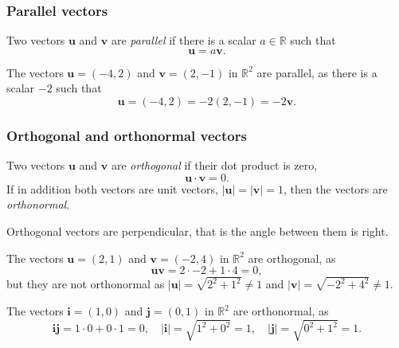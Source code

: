 \begin{frame}
\frametitle{Parallel vectors}
\begin{definition}
Two vectors $\mathbf{u}$ and $\mathbf{v}$ are \emph{parallel} if there is a scalar $a\in\mathbb{R}$ such that 
\[
\mathbf{u} = a\mathbf{v}.
\]
\end{definition}

The vectors $\mathbf{u}=(-4,2)$ and $\mathbf{v}=(2,-1)$ in $\mathbb{R}^2$ are parallel, as there is a scalar $-2$ such that
\[
\mathbf{u}= (-4,2) = -2(2,-1) = -2\mathbf{v}.
\]
\end{frame}


\begin{frame}
\frametitle{Orthogonal and orthonormal vectors}
\begin{definition}
Two vectors $\mathbf{u}$ and $\mathbf{v}$ are \emph{orthogonal} if their dot product is zero,
\[
\mathbf{u}\cdot \mathbf{v} = 0.
\]
If in addition both vectors are unit vectors, $|\mathbf{u}|=|\mathbf{v}|=1$, then the vectors are \emph{orthonormal}.
\end{definition}

Orthogonal vectors are perpendicular, that is the angle between them is right.

The vectors $\mathbf{u}=(2,1)$ and $\mathbf{v}=(-2,4)$ in $\mathbb{R}^2$ are orthogonal, as
\[
\mathbf{u}\mathbf{v} = 2\cdot -2 +1\cdot 4 = 0,
\]
but they are not orthonormal as $|\mathbf{u}| = \sqrt{2^2+1^2} \neq 1$ and $|\mathbf{v}| = \sqrt{-2^2+4^2} \neq 1$.

The vectors $\mathbf{i}=(1,0)$ and $\mathbf{j}=(0,1)$ in $\mathbb{R}^2$ are orthonormal, as
\[
\mathbf{i}\mathbf{j} = 1\cdot 0 +0\cdot 1 = 0, \quad |\mathbf{i}| = \sqrt{1^2+0^2} = 1,  \quad |\mathbf j| = \sqrt{0^2+1^2} = 1.
\]
\end{frame}



